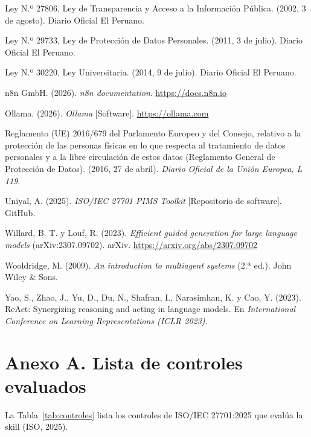 \documentclass[12pt,letterpaper]{article}
\newenvironment{referencias}{%
  \par\begingroup\setlength{\parindent}{0pt}\RaggedRight%
  \everypar{\hangindent=1.27cm\hangafter=1}%
  \setlength{\parskip}{6pt}}{\par\endgroup}
\begin{document}
\begin{referencias}
Ley N.º 27806, Ley de Transparencia y Acceso a la Información Pública. (2002, 3 de agosto). Diario Oficial El Peruano.

Ley N.º 29733, Ley de Protección de Datos Personales. (2011, 3 de julio). Diario Oficial El Peruano.

Ley N.º 30220, Ley Universitaria. (2014, 9 de julio). Diario Oficial El Peruano.

n8n GmbH. (2026). \textit{n8n documentation}. \url{https://docs.n8n.io}

Ollama. (2026). \textit{Ollama} [Software]. \url{https://ollama.com}

Reglamento (UE) 2016/679 del Parlamento Europeo y del Consejo, relativo a la protección de las personas físicas en lo que respecta al tratamiento de datos personales y a la libre circulación de estos datos (Reglamento General de Protección de Datos). (2016, 27 de abril). \textit{Diario Oficial de la Unión Europea, L 119}.

Uniyal, A. (2025). \textit{ISO/IEC 27701 PIMS Toolkit} [Repositorio de software]. GitHub.

Willard, B. T. y Louf, R. (2023). \textit{Efficient guided generation for large language models} (arXiv:2307.09702). arXiv. \url{https://arxiv.org/abs/2307.09702}

Wooldridge, M. (2009). \textit{An introduction to multiagent systems} (2.ª ed.). John Wiley \& Sons.

Yao, S., Zhao, J., Yu, D., Du, N., Shafran, I., Narasimhan, K. y Cao, Y. (2023). ReAct: Synergizing reasoning and acting in language models. En \textit{International Conference on Learning Representations (ICLR 2023)}.
\end{referencias}

\newpage
\section{Anexo A. Lista de controles evaluados}
\label{anx:controles}

La Tabla~\ref{tab:controles} lista los controles de ISO/IEC 27701:2025 que evalúa la skill (ISO, 2025).
\end{document}
